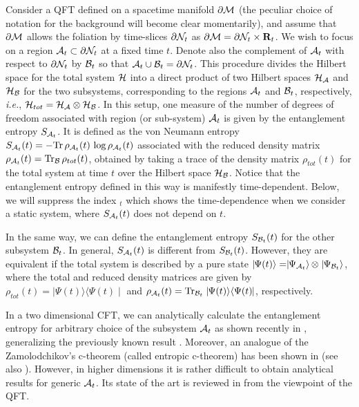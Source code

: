 \documentclass[12pt]{article}
\def\ie{{\it i.e.}}
\def\p{\partial}
\def\CA{{\cal A}}
\def\CB{{\cal B}}
\def\CH{{\cal H}}
\def\R{{\bf R}}
\def\p{\partial}
\def\p{\partial}
\def\ket#1{\mid  \! \! #1   \rangle}
\def\bra#1{\langle   #1 \! \! \mid}
\def\bdy{\p{\cal M}}
\def\bdys{\p{\cal N}}
\def\rA{\CA}
\def\rB{\CB}
\begin{document}
Consider a QFT defined on a spacetime manifold $\bdy$ (the peculiar
choice of notation for the background  will become clear
momentarily), and assume that $\bdy$ allows the
 foliation by time-slices $\bdys_t$ as $\bdy=\bdys_t \times \R_t$.
We wish to focus on a region $\rA_t \subset \bdys_t$ at a fixed time
$t$.  Denote also the complement of $\rA_t$ with respect to
$\bdys_t$ by $\rB_t$ so that $\rA_t \cup \rB_t= \bdys_t$. This
procedure divides the Hilbert space for the total system ${\cal
{H}}$ into a direct product of two Hilbert spaces ${\cal {H}}_{\rA}$
and ${\cal {H}}_{\rB}$ for the two subsystems, corresponding to the
regions $\rA_t$ and $\rB_t$, respectively, \ie, ${\cal {H}}_{tot}=
{\cal {H}}_{\rA}\otimes {\cal {H}}_{\rB}$. In this setup, one
measure of the number of degrees of freedom associated with region
(or sub-system) $\rA_t$ is given by the entanglement entropy
$S_{\rA_t}$. It is defined as the von Neumann entropy $S_{\rA_t}(t)
=-\mbox{Tr} \, \rho_{\rA_t}(t) \, \log \rho_{\rA_t}(t)$  associated
with the reduced density matrix
$\rho_{\rA_t}(t)=\mbox{Tr}_{\rB}\,\rho_{tot}(t)$,  obtained by
taking a trace of the density matrix $\rho_{tot}(t)$  for the total
system at time $t$  over the Hilbert space $\CH_{\rB}$. Notice that
the entanglement entropy defined in  this way is manifestly
time-dependent. Below, we will suppress the index ${}_t$ which shows
the time-dependence when we consider a static system, where
$S_{\rA_t}(t)$ does not depend on $t$.

In the same way, we can define the entanglement entropy $S_{\rB_t}(t)$ for the other subsystem $\rB_t$. In  general, $S_{\rA_t}(t)$ is different from $S_{\rB_t}(t)$. However, they are equivalent if the total system is described by a pure state $\ket{\Psi(t)} = \ket{\Psi_{\rA_t}} \,\otimes  \ket{\Psi_{\rB_t}}$, where the total and reduced density matrices are given by $\rho_{tot}(t)=\ket{\Psi(t)}\bra{\Psi(t)}$ and $\rho_{\rA_t}(t)=\mbox{Tr}_{\rB_t}\ket{\Psi(t)}\bra{\Psi(t)}$, respectively.

 In a two dimensional CFT, we can analytically calculate the entanglement entropy for arbitrary choice of the subsystem $\rA_t$ as shown recently in \cite{Calabrese:2004eu}, generalizing the previously known result \cite{Holzhey:1994we}. Moreover, an analogue of the Zamolodchikov's c-theorem (called entropic c-theorem) has been shown in  \cite{Casini:2004bw, Casini:uq} (see also \cite{Solodukhin:2006ic}). However, in higher dimensions it is rather difficult to obtain analytical results for generic $\rA_t$. Its state of the art is reviewed in \cite{Ryu:2006ef} from the viewpoint of the QFT.
\end{document}
